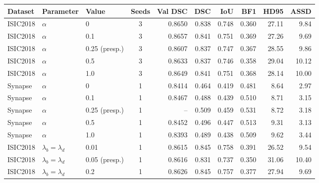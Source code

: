 \begin{tabular}{lllcrrrrrr}
\toprule
Dataset & Parameter & Value & Seeds & Val DSC & DSC & IoU & BF1 & HD95 & ASSD \\
\midrule
ISIC2018 & $\alpha$ & 0 & 3 & 0.8650 & 0.838 & 0.748 & 0.360 & 27.11 & 9.84 \\
ISIC2018 & $\alpha$ & 0.1 & 3 & 0.8657 & 0.841 & 0.751 & 0.369 & 27.26 & 9.69 \\
ISIC2018 & $\alpha$ & 0.25 (presp.) & 3 & 0.8607 & 0.837 & 0.747 & 0.367 & 28.55 & 9.86 \\
ISIC2018 & $\alpha$ & 0.5 & 3 & 0.8633 & 0.837 & 0.746 & 0.358 & 29.04 & 10.12 \\
ISIC2018 & $\alpha$ & 1.0 & 3 & 0.8649 & 0.841 & 0.751 & 0.368 & 28.14 & 10.00 \\
Synapse & $\alpha$ & 0 & 1 & 0.8414 & 0.464 & 0.419 & 0.481 & 8.64 & 2.97 \\
Synapse & $\alpha$ & 0.1 & 1 & 0.8467 & 0.488 & 0.439 & 0.510 & 8.71 & 3.15 \\
Synapse & $\alpha$ & 0.25 (presp.) & 1 & -- & 0.509 & 0.459 & 0.531 & 8.72 & 3.18 \\
Synapse & $\alpha$ & 0.5 & 1 & 0.8452 & 0.496 & 0.447 & 0.513 & 9.31 & 3.13 \\
Synapse & $\alpha$ & 1.0 & 1 & 0.8393 & 0.489 & 0.438 & 0.509 & 9.62 & 3.44 \\
ISIC2018 & $\lambda_b=\lambda_d$ & 0.01 & 1 & 0.8615 & 0.845 & 0.758 & 0.391 & 26.52 & 9.54 \\
ISIC2018 & $\lambda_b=\lambda_d$ & 0.05 (presp.) & 1 & 0.8616 & 0.831 & 0.737 & 0.350 & 31.06 & 10.40 \\
ISIC2018 & $\lambda_b=\lambda_d$ & 0.2 & 1 & 0.8626 & 0.845 & 0.757 & 0.377 & 27.94 & 9.69 \\
\bottomrule
\end{tabular}
